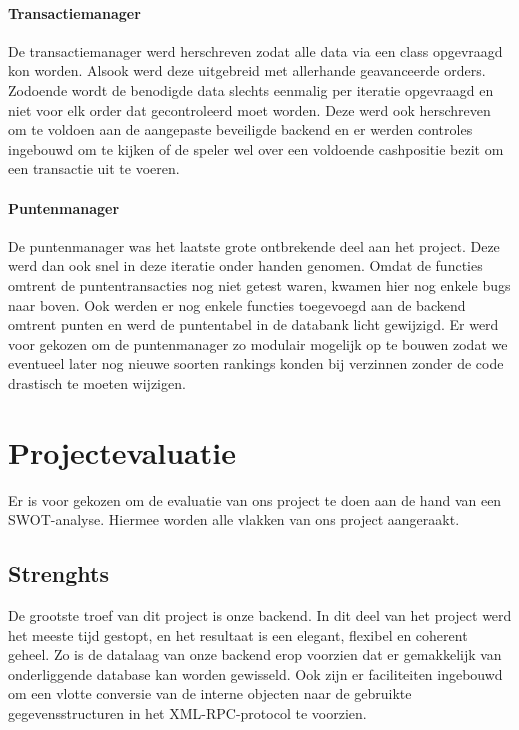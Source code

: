 \subsubsection{Transactiemanager}
De transactiemanager werd herschreven zodat alle data via een class opgevraagd kon worden. Alsook werd deze uitgebreid met allerhande geavanceerde orders.
Zodoende wordt de benodigde data slechts eenmalig per iteratie opgevraagd en niet voor elk order dat gecontroleerd moet worden. Deze werd ook herschreven om te voldoen aan de aangepaste beveiligde backend en er werden controles ingebouwd om te kijken of de speler wel over een voldoende cashpositie bezit om een transactie uit te voeren.

\subsubsection{Puntenmanager}
De puntenmanager was het laatste grote ontbrekende deel aan het project. Deze werd dan ook snel in deze iteratie onder handen genomen. Omdat de functies omtrent de puntentransacties nog niet getest waren, kwamen hier nog enkele bugs naar boven. Ook werden er nog enkele functies toegevoegd aan de backend omtrent punten en werd de puntentabel in de databank licht gewijzigd. Er werd voor gekozen om de puntenmanager zo modulair mogelijk op te bouwen zodat we eventueel later nog nieuwe soorten rankings konden bij verzinnen zonder de code drastisch te moeten wijzigen.

\chapter{Projectevaluatie}
Er is voor gekozen om de evaluatie van ons project te doen aan de hand van een SWOT-analyse. Hiermee worden alle vlakken van ons project aangeraakt.

\section{Strenghts}

De grootste troef van dit project is onze backend. In dit deel van het project werd het meeste tijd gestopt, en het resultaat is een elegant, flexibel en coherent geheel. 
Zo is de datalaag van onze backend erop voorzien dat er gemakkelijk van onderliggende database kan worden gewisseld. Ook zijn er faciliteiten ingebouwd om een vlotte conversie van de interne objecten naar de gebruikte gegevensstructuren in het XML-RPC-protocol te voorzien.


